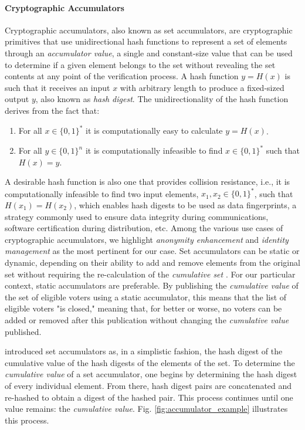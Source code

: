 \documentclass[../main.tex]{subfiles}
\begin{document}
            \paragraph{Cryptographic Accumulators}
            \label{cryptographic_accumulators}
                Cryptographic accumulators, also known as set accumulators, are cryptographic primitives that use unidirectional hash functions to represent a set of elements through an \textit{accumulator value}, a single and constant-size value that can be used to determine if a given element belongs to the set without revealing the set contents at any point of the verification process. A hash function $ y = H(x) $ is such that it receives an input $ x $ with arbitrary length to produce a fixed-sized output $ y $, also known as \textit{hash digest}. The unidirectionality of the hash function derives from the fact that:
                
                \begin{enumerate}
                    \item{For all $ x \in \{0, 1\}^* $ it is computationally easy to calculate $ y = H(x) $}.
                    \item{For all $ y \in \{0, 1\}^n $ it is computationally infeasible to find $ x \in \{0, 1\}^* $ such that $ H(x) = y $}.
                \end{enumerate}

                A desirable hash function is also one that provides collision resistance, i.e., it is computationally infeasible to find two input elements, $ x_1, x_2 \in \{0,1\}^* $, such that $ H(x_1) = H(x_2) $, which enables hash digests to be used as data fingerprints, a strategy commonly used to ensure data integrity during communications, software certification during distribution, etc. Among the various use cases of cryptographic accumulators, we highlight \textit{anonymity enhancement} and \textit{identity management} as the most pertinent for our case. Set accumulators can be static or dynamic, depending on their ability to add and remove elements from the original set without requiring the re-calculation of the \textit{cumulative set} \cite{Loporchio2023}. For our particular context, static accumulators are preferable. By publishing the \textit{cumulative value} of the set of eligible voters using a static accumulator, this means that the list of eligible voters "is closed," meaning that, for better or worse, no voters can be added or removed after this publication without changing the \textit{cumulative value} published. 
                \par
                \cite{Benaloh1993} introduced set accumulators as, in a simplistic fashion, the hash digest of the cumulative value of the hash digests of the elements of the set. To determine the \textit{cumulative value} of a set accumulator, one begins by determining the hash digest of every individual element. From there, hash digest pairs are concatenated and re-hashed to obtain a digest of the hashed pair. This process continues until one value remains: the \textit{cumulative value}. Fig. \ref{fig:accumulator_example} illustrates this process.
\end{document}

